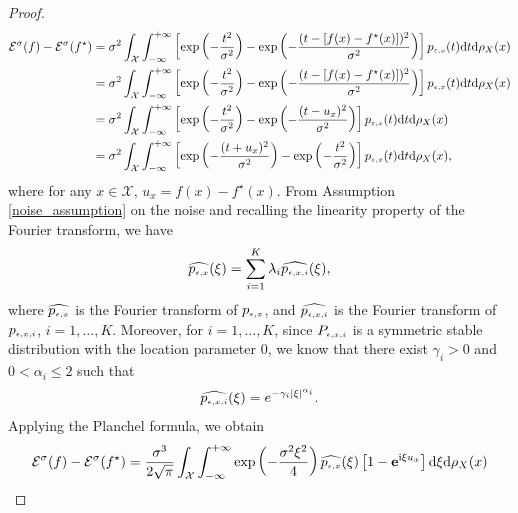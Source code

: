 \documentclass[11pt]{article}
\begin{document}
\begin{proof}
	\begin{align*}
	\mathcal{E}^\sigma(f)-\mathcal{E}^\sigma(f^\star)&=\sigma^2\int_{\mathcal{X}}\int_{-\infty}^{+\infty} \left[\exp\left(-\frac{t^2}{\sigma^2}\right)-\exp\left(-\frac{(t-[f(x)-f^\star(x)])^2}{\sigma^2}\right)\right]p_\mathsmaller{\varepsilon,x}(t){\mathrm{d}}t\mathrm{d}\rho_X(x)\\
	&=\sigma^2\int_{\mathcal{X}}\int_{-\infty}^{+\infty} \left[\exp\left(-\frac{t^2}{\sigma^2}\right)-\exp\left(-\frac{(t-[f(x)-f^\star(x)])^2}{\sigma^2}\right)\right]p_\mathsmaller{\varepsilon,x}(t){\mathrm{d}}t\mathrm{d}\rho_X(x)\\
	&=\sigma^2\int_{\mathcal{X}}\int_{-\infty}^{+\infty} \left[\exp\left(-\frac{t^2}{\sigma^2}\right)-\exp\left(-\frac{(t-u_x)^2}{\sigma^2}\right)\right]p_\mathsmaller{\varepsilon,x}(t){\mathrm{d}}t\mathrm{d}\rho_X(x)\\
	&=\sigma^2\int_{\mathcal{X}}\int_{-\infty}^{+\infty} \left[\exp\left(-\frac{(t+u_x)^2}{\sigma^2}\right)-\exp\left(-\frac{t^2}{\sigma^2}\right)\right]p_\mathsmaller{\varepsilon,x}(t){\mathrm{d}}t\mathrm{d}\rho_X(x),
	\end{align*} 
	where for any $x\in\mathcal{X}$, $u_x=f(x)-f^\star(x)$. From  Assumption \ref{noise_assumption} on the noise and recalling the linearity property of the Fourier transform, we have
	\begin{align*}
	\widehat{p_\mathsmaller{{\epsilon,x}}}(\xi)=\sum_{i=1}^K \lambda_i \widehat{p_\mathsmaller{{\epsilon,x,i}}}(\xi),
	\end{align*}
	where $\widehat{p_\mathsmaller{{\epsilon,x}}}$ is the Fourier transform of $p_\mathsmaller{{\epsilon,x}}$, and $\widehat{p_\mathsmaller{{\epsilon,x,i}}}$ is the Fourier transform of $p_\mathsmaller{{\epsilon,x,i}}$, $i=1,\ldots,K$. Moreover, for $i=1,\ldots,K$, since $P_\mathsmaller{{\epsilon,x,i}}$ is a symmetric stable distribution with the location parameter $0$, we know that there exist  $\gamma_i>0$ and $0<\alpha_i\leq 2$ such that
	\begin{align*}
	\widehat{p_\mathsmaller{{\epsilon,x,i}}}(\xi)=e^{-\gamma_i|\xi|^{\alpha_i}}.
	\end{align*} 
	Applying the Planchel formula, we obtain
	\begin{align*}
	\mathcal{E}^\sigma(f)-\mathcal{E}^\sigma(f^\star)&=\frac{\sigma^3}{2\sqrt{\pi}}\int_\mathcal{X}\int_{-\infty}^{+\infty}\exp\left(-\frac{\sigma^2\xi^2}{4}\right)\widehat{p_\mathsmaller{{\epsilon,x}}}(\xi)\left[1-\bold{e}^{\mathrm{i} \xi u_x }\right]\mathrm{d}\xi \mathrm{d}\rho_X(x)\\

\end{align*}
\end{proof}
\end{document}
